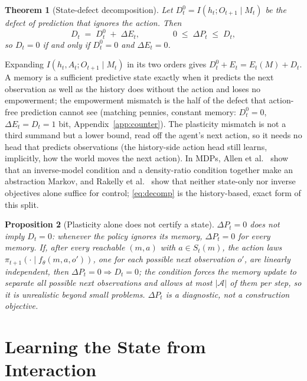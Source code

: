 \documentclass[11pt]{article}
\theoremstyle{plain}
\newtheorem{theorem}{Theorem}
\newtheorem{proposition}[theorem]{Proposition}
\theoremstyle{definition}
\theoremstyle{remark}
\newcommand{\calA}{\mathcal{A}}
\newcommand{\dE}{\Delta E}
\newcommand{\dP}{\Delta P}
\begin{document}
\begin{theorem}[State-defect decomposition]\label{thm:decomp}
Let $D^0_t = I(h_t; O_{t+1} \mid M_t)$ be the defect of prediction that ignores the action. Then
\begin{equation}
D_t \;=\; D^0_t \;+\; \dE_t, \qquad\qquad 0 \;\le\; \dP_t \;\le\; D_t , \label{eq:decomp}
\end{equation}
so $D_t = 0$ if and only if $D^0_t = 0$ and $\dE_t = 0$.
\end{theorem}
Expanding $I(h_t, A_t; O_{t+1} \mid M_t)$ in its two orders gives $D^0_t + E_t = E_t(M) + D_t$. A memory is a sufficient predictive state exactly when it predicts the next observation as well as the history does without the action and loses no empowerment; the empowerment mismatch is the half of the defect that action-free prediction cannot see (matching pennies, constant memory: $D^0_t = 0$, $\dE_t = D_t = 1$ bit, Appendix~\ref{app:counter}). The plasticity mismatch is not a third summand but a lower bound, read off the agent's next action, so it needs no head that predicts observations (the history-side action head still learns, implicitly, how the world moves the next action). In MDPs, Allen et al.\ \cite{allen2021learning} show that an inverse-model condition and a density-ratio condition together make an abstraction Markov, and Rakelly et al.\ \cite{rakelly2021which} show that neither state-only nor inverse objectives alone suffice for control; \eqref{eq:decomp} is the history-based, exact form of this split.
\begin{proposition}[Plasticity alone does not certify a state]\label{prop:plast}
$\dP_t = 0$ does not imply $D_t = 0$: whenever the policy ignores its memory, $\dP_t = 0$ for every memory. If, after every reachable $(m, a)$ with $a \in S_t(m)$, the action laws $\pi_{t+1}(\cdot \mid f_\theta(m, a, o'))$, one for each possible next observation $o'$, are linearly independent, then $\dP_t = 0 \Rightarrow D_t = 0$; the condition forces the memory update to separate all possible next observations and allows at most $|\calA|$ of them per step, so it is unrealistic beyond small problems. $\dP_t$ is a diagnostic, not a construction objective.
\end{proposition}

\section{Learning the State from Interaction}
\end{document}
